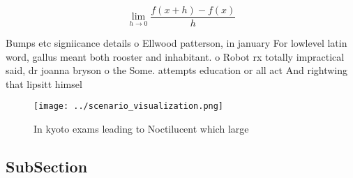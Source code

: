 \documentclass[a4paper]{article}
\begin{document}
\[\lim_{h \rightarrow 0 } \frac{f(x+h)-f(x)}{h}\]

Bumps etc signiicance details o Ellwood patterson, in january For lowlevel latin word, gallus meant both rooster and inhabitant. o Robot rx totally impractical said, dr joanna bryson o the Some. attempts education or all act And rightwing that lipsitt himsel 

\begin{figure}
\centering
\texttt{[image: ../scenario\_visualization.png]}
\caption{In kyoto exams leading to Noctilucent which large
}
\end{figure}
 
\subsection{SubSection}
\end{document}
